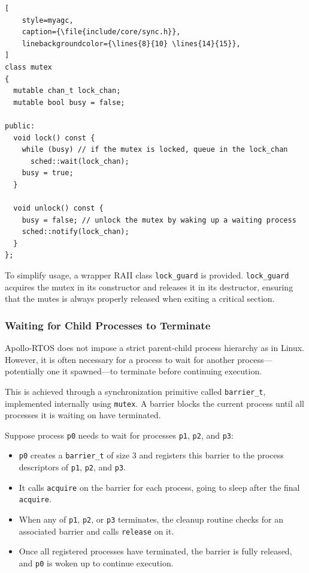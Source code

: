 \begin{lstlisting}[
    style=myagc,
    caption={\file{include/core/sync.h}},
    linebackgroundcolor={\lines{8}{10} \lines{14}{15}},
]
class mutex
{
  mutable chan_t lock_chan;
  mutable bool busy = false;

public:
  void lock() const {
    while (busy) // if the mutex is locked, queue in the lock_chan
      sched::wait(lock_chan);
    busy = true;
  }

  void unlock() const {
    busy = false; // unlock the mutex by waking up a waiting process
    sched::notify(lock_chan);
  }
};
\end{lstlisting}

To simplify usage, a wrapper RAII class \lstinline[style=myagc]|lock_guard| is provided.
\lstinline[style=myagc]|lock_guard| acquires the mutex in its constructor and releases
it in its destructor, ensuring that the mutes is always properly released when exiting
a critical section.


\subsubsection{Waiting for Child Processes to Terminate}

Apollo-RTOS does not impose a strict parent-child process hierarchy as in Linux.
However, it is often necessary for a process to wait for another process—potentially
one it spawned—to terminate before continuing execution.

This is achieved through a synchronization primitive called
\lstinline[style=myagc]|barrier_t|, implemented internally using
\lstinline[style=myagc]|mutex|. A barrier blocks the current process until all
processes it is waiting on have terminated.

Suppose process \lstinline[style=myagc]|p0| needs to wait for processes
\lstinline[style=myagc]|p1|, \lstinline[style=myagc]|p2|, and
\lstinline[style=myagc]|p3|:
\begin{itemize}
    \item \lstinline[style=myagc]|p0| creates a \lstinline[style=myagc]|barrier_t| of
    size 3 and registers this barrier to the process descriptors of
    \lstinline[style=myagc]|p1|, \lstinline[style=myagc]|p2|, and
    \lstinline[style=myagc]|p3|.
    \item It calls \lstinline[style=myagc]|acquire| on the barrier for each process,
    going to sleep after the final \lstinline[style=myagc]|acquire|.
    \item When any of \lstinline[style=myagc]|p1|, \lstinline[style=myagc]|p2|, or
        \lstinline[style=myagc]|p3| terminates, the cleanup routine checks for an
        associated barrier and calls \lstinline[style=myagc]|release| on it.
    \item Once all registered processes have terminated, the barrier is fully released,
        and \lstinline[style=myagc]|p0| is woken up to continue execution.
\end{itemize}

